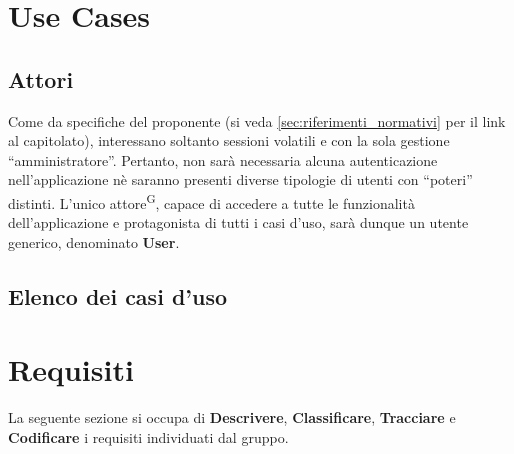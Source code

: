 \newpage
\section{Use Cases}\label{sec:use_cases}

\subsection{Attori}\label{subsec:attori}
Come da specifiche del proponente (si veda \ref{sec:riferimenti_normativi} per il link al capitolato), interessano soltanto sessioni volatili e con la sola gestione ``amministratore”. Pertanto, non sarà necessaria alcuna autenticazione nell'applicazione nè saranno presenti diverse tipologie di utenti con ``poteri'' distinti. L'unico attore\textsuperscript{G}, capace di accedere a tutte le funzionalità dell'applicazione e protagonista di tutti i casi d'uso, sarà dunque un utente generico, denominato \textbf{User}.

\subsection{Elenco dei casi d'uso}\label{subsec:elenco_use_cases}
\setcounter{secnumdepth}{0}         %


























\setcounter{secnumdepth}{3} 


\newpage
\section{Requisiti}\label{sec:requisiti}
La seguente sezione si occupa di \textbf{Descrivere}, \textbf{Classificare}, \textbf{Tracciare} e \textbf{Codificare}
i requisiti individuati dal gruppo. 

